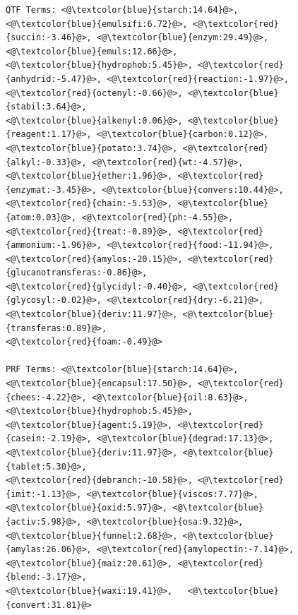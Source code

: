 \begin{figure}[t!]
\begin{framed}
\begin{lstlisting}[basicstyle=\tiny\ttfamily , linewidth=\columnwidth,breaklines=true]
QTF Terms: <@\textcolor{blue}{starch:14.64}@>, <@\textcolor{blue}{emulsifi:6.72}@>, <@\textcolor{red}{succin:-3.46}@>, <@\textcolor{blue}{enzym:29.49}@>, <@\textcolor{blue}{emuls:12.66}@>, 
<@\textcolor{blue}{hydrophob:5.45}@>, <@\textcolor{red}{anhydrid:-5.47}@>, <@\textcolor{red}{reaction:-1.97}@>, <@\textcolor{red}{octenyl:-0.66}@>, <@\textcolor{blue}{stabil:3.64}@>, 
<@\textcolor{blue}{alkenyl:0.06}@>, <@\textcolor{blue}{reagent:1.17}@>, <@\textcolor{blue}{carbon:0.12}@>, <@\textcolor{blue}{potato:3.74}@>, <@\textcolor{red}{alkyl:-0.33}@>, <@\textcolor{red}{wt:-4.57}@>, 
<@\textcolor{blue}{ether:1.96}@>, <@\textcolor{red}{enzymat:-3.45}@>, <@\textcolor{blue}{convers:10.44}@>, <@\textcolor{red}{chain:-5.53}@>, <@\textcolor{blue}{atom:0.03}@>, <@\textcolor{red}{ph:-4.55}@>, 
<@\textcolor{red}{treat:-0.89}@>, <@\textcolor{red}{ammonium:-1.96}@>, <@\textcolor{red}{food:-11.94}@>, <@\textcolor{red}{amylos:-20.15}@>, <@\textcolor{red}{glucanotransferas:-0.86}@>, 
<@\textcolor{red}{glycidyl:-0.40}@>, <@\textcolor{red}{glycosyl:-0.02}@>, <@\textcolor{red}{dry:-6.21}@>, <@\textcolor{blue}{deriv:11.97}@>, <@\textcolor{blue}{transferas:0.89}@>, 
<@\textcolor{red}{foam:-0.49}@> 

PRF Terms: <@\textcolor{blue}{starch:14.64}@>, <@\textcolor{blue}{encapsul:17.50}@>, <@\textcolor{red}{chees:-4.22}@>, <@\textcolor{blue}{oil:8.63}@>, <@\textcolor{blue}{hydrophob:5.45}@>,
<@\textcolor{blue}{agent:5.19}@>, <@\textcolor{red}{casein:-2.19}@>, <@\textcolor{blue}{degrad:17.13}@>, <@\textcolor{blue}{deriv:11.97}@>, <@\textcolor{blue}{tablet:5.30}@>,
<@\textcolor{red}{debranch:-10.58}@>, <@\textcolor{red}{imit:-1.13}@>, <@\textcolor{blue}{viscos:7.77}@>, <@\textcolor{blue}{oxid:5.97}@>, <@\textcolor{blue}{activ:5.98}@>, <@\textcolor{blue}{osa:9.32}@>,
<@\textcolor{blue}{funnel:2.68}@>, <@\textcolor{blue}{amylas:26.06}@>, <@\textcolor{red}{amylopectin:-7.14}@>, <@\textcolor{blue}{maiz:20.61}@>, <@\textcolor{red}{blend:-3.17}@>, 
<@\textcolor{blue}{waxi:19.41}@>,   <@\textcolor{blue}{convert:31.81}@>


\end{lstlisting}
\end{framed}
\end{figure}
